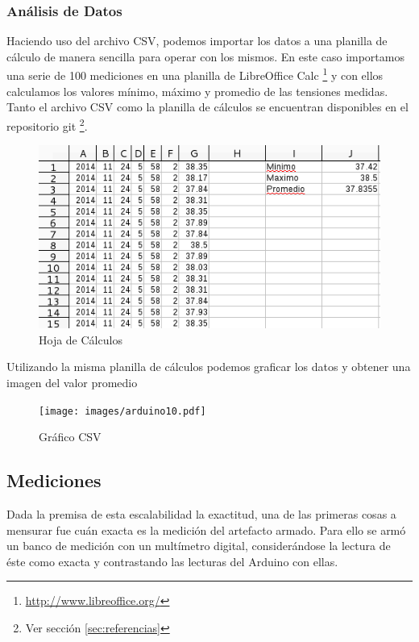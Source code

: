 \documentclass[12pt,a4paper]{article}
\begin{document}
			\subsubsection{Análisis de Datos}
				Haciendo uso del archivo CSV, podemos importar los datos a una planilla de cálculo de manera sencilla para operar con los mismos. En este caso importamos una serie de 100 mediciones en una planilla de LibreOffice Calc \footnote{\url{http://www.libreoffice.org/}} y con ellos calculamos los valores mínimo, máximo y promedio de las tensiones medidas. Tanto el archivo CSV como la planilla de cálculos se encuentran disponibles en el repositorio git \footnote{Ver sección \ref{sec:referencias}}.

				\begin{figure}[H]
					\centering
					\includegraphics[scale=1]{images/arduino9.png}\caption{Hoja de Cálculos}
					\end{figure}

				Utilizando la misma planilla de cálculos podemos graficar los datos y obtener una imagen del valor promedio

				\begin{figure}[H]
					\centering
					\texttt{[image: images/arduino10.pdf]}\caption{Gráfico CSV}
					\end{figure}


		\subsection{Mediciones}

			Dada la premisa de esta escalabilidad la exactitud, una de las primeras cosas a mensurar fue cuán exacta es la medición del artefacto armado. Para ello se armó un banco de medición con un multímetro digital, considerándose la lectura de éste como exacta y contrastando las lecturas del Arduino con ellas.
\end{document}

